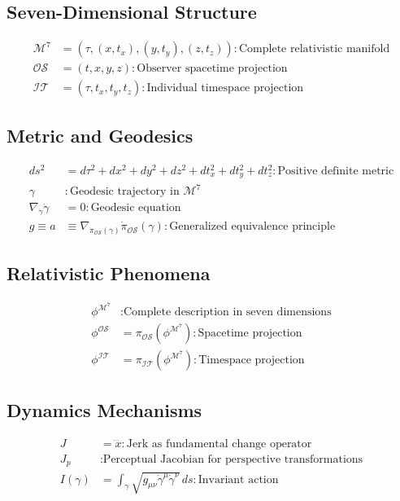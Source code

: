 \documentclass{article}
\begin{document}
\subsection{Seven-Dimensional Structure}
\begin{align}
\mathcal{M}^7 &= (\tau, (x, t_x), (y, t_y), (z, t_z)) : \text{Complete relativistic manifold} \\
\mathcal{OS} &= (t, x, y, z) : \text{Observer spacetime projection} \\
\mathcal{IT} &= (\tau, t_x, t_y, t_z) : \text{Individual timespace projection}
\end{align}

\subsection{Metric and Geodesics}
\begin{align}
ds^2 &= d\tau^2 + dx^2 + dy^2 + dz^2 + dt_x^2 + dt_y^2 + dt_z^2 : \text{Positive definite metric} \\
\gamma &: \text{Geodesic trajectory in } \mathcal{M}^7 \\
\nabla_{\dot{\gamma}}\dot{\gamma} &= 0 : \text{Geodesic equation} \\
g \equiv a &\equiv \nabla_{\dot{\pi}_{\mathcal{OS}}(\gamma)}\dot{\pi}_{\mathcal{OS}}(\gamma) : \text{Generalized equivalence principle}
\end{align}

\subsection{Relativistic Phenomena}
\begin{align}
\phi^{\mathcal{M}^7} &: \text{Complete description in seven dimensions} \\
\phi^{\mathcal{OS}} &= \pi_{\mathcal{OS}}(\phi^{\mathcal{M}^7}) : \text{Spacetime projection} \\
\phi^{\mathcal{IT}} &= \pi_{\mathcal{IT}}(\phi^{\mathcal{M}^7}) : \text{Timespace projection}
\end{align}

\subsection{Dynamics Mechanisms}
\begin{align}
J &= \dddot{x} : \text{Jerk as fundamental change operator} \\
J_p &: \text{Perceptual Jacobian for perspective transformations} \\
I(\gamma) &= \int_{\gamma} \sqrt{g_{\mu\nu}\dot{\gamma}^\mu\dot{\gamma}^\nu} \, ds : \text{Invariant action}
\end{align}
\end{document}
